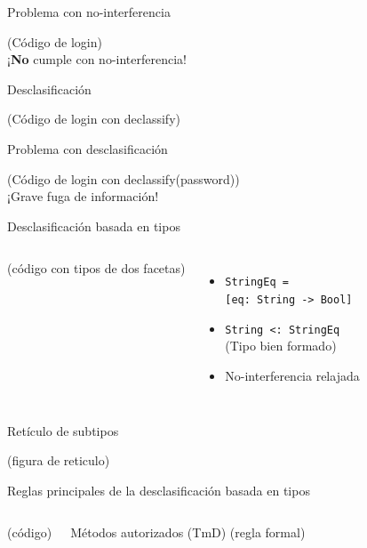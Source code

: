 \documentclass[aspectratio=169,10pt]{beamer}
\begin{document}
\begin{frame}[fragile]{Problema con no-interferencia}
	\begin{center}
		(Código de login) \pause \\
		\vspace{4cm}
		\alert{¡\textbf{No} cumple con no-interferencia!}
	\end{center}
\end{frame}

\begin{frame}[fragile]{Desclasificación}
	\begin{center}
		(Código de login con declassify)
	\end{center}
\end{frame}

\begin{frame}[fragile]{Problema con desclasificación}
	\begin{center}
		(Código de login con declassify(password)) \pause \\
		\vspace{4cm}
		\alert{¡Grave fuga de información!}
	\end{center}
\end{frame}

\begin{frame}[fragile]{Desclasificación basada en tipos}
	\begin{columns}[T,onlytextwidth]
		(código con tipos de dos facetas)
		\begin{itemize}
			\item \texttt{StringEq =} \\ \texttt{[eq: String -> Bool]}
			\item \texttt{String <: StringEq} \\ (Tipo bien formado)
			\item No-interferencia relajada
		\end{itemize}
	\end{columns}
\end{frame}

\begin{frame}[fragile]{Retículo de subtipos}
	\begin{center}
		(figura de reticulo)
	\end{center}
\end{frame}

\begin{frame}[fragile]{Reglas principales de la desclasificación basada en tipos}
	\begin{columns}[T,onlytextwidth]
		(código)
		\begin{block}{Métodos autorizados (TmD)}
			(regla formal)
		\end{block}
	\end{columns}
\end{frame}
\end{document}

